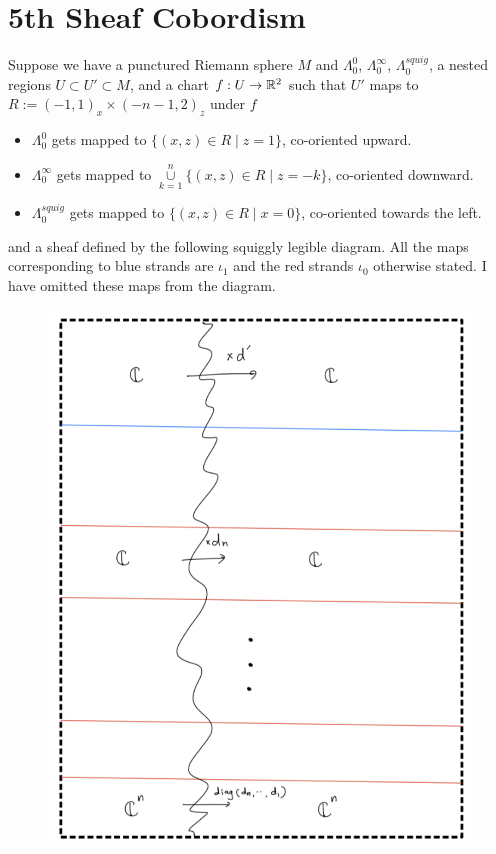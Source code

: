 \section{5th Sheaf Cobordism}
Suppose we have a punctured Riemann sphere $M$ and $\Lambda_0^0$, $\Lambda_0^\infty$, $\Lambda_0^{squig}$, a nested regions $U\subset U' \subset M$, and a chart $f : U \rightarrow \mathbb{R}^2$ such that $U'$ maps to $R:=(-1,1)_x \times (-n-1,2)_z$ under $f$
\begin{itemize}
\item $\Lambda_0^0$ gets mapped to $\{(x,z)\in R \mid z=1\}$, co-oriented upward.

\item $\Lambda_0^\infty$ gets mapped to $\overset{n}{\underset{k=1}{\cup}}\{(x,z)\in R \mid z=-k\}$, co-oriented downward.

\item $\Lambda_0^{squig}$ gets mapped to $\{(x,z)\in R \mid x=0\}$, co-oriented towards the left.
\end{itemize}
and a sheaf defined by the following squiggly legible diagram. All the maps corresponding to blue strands are $\iota_1$ and the red strands $\iota_0$ otherwise stated. I have omitted these maps from the diagram.\\
\begin{figure}[H]
    \centering
    \includegraphics[scale = 0.95]{diagrams/cobord5/1.png} 
    \caption{}
    \label{fig:your-label}
\end{figure}


